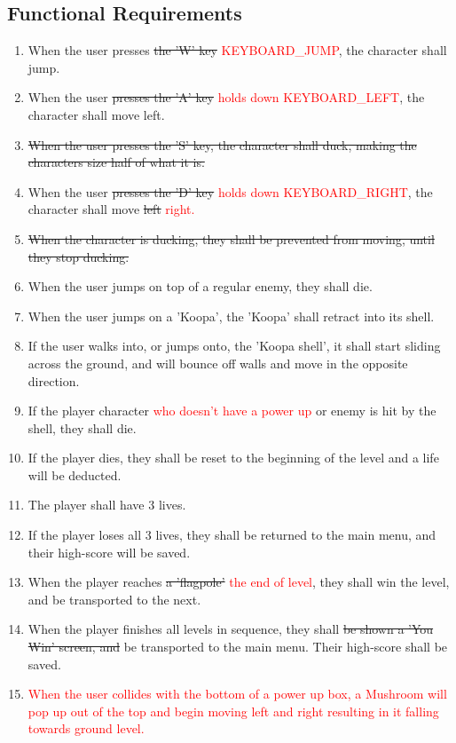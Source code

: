 \documentclass[12pt, titlepage]{article}
\begin{document}
\subsection{Functional Requirements}
\begin{enumerate}[{FR}1. ]
    \item When the user presses \sout{the 'W' key} \textcolor{red}{KEYBOARD\_JUMP}, the character shall jump.
    \item When the user \sout{presses the 'A' key} \textcolor{red}{holds down KEYBOARD\_LEFT}, the character shall move left.
    \item \sout{When the user presses the 'S' key, the character shall duck, making the characters size half of what it is.}
    \item When the user \sout{presses the 'D' key} \textcolor{red}{holds down KEYBOARD\_RIGHT}, the character shall move \sout{left} \textcolor{red}{right.}
    \item \sout{When the character is ducking, they shall be prevented from moving, until they stop ducking.}
    \item When the user jumps on top of a regular enemy, they shall die.
    \item When the user jumps on a 'Koopa', the 'Koopa' shall retract into its shell.
    \item If the user walks into, or jumps onto, the 'Koopa shell', it shall start sliding across the ground, and will bounce off walls and move in the opposite direction.
    \item If the player character \textcolor{red}{who doesn't have a power up} or enemy is hit by the shell, they shall die.
    \item If the player dies, they shall be reset to the beginning of the level and a life will be deducted.
    \item The player shall have 3 lives.
    \item If the player loses all 3 lives, they shall be returned to the main menu, and their high-score will be saved.
    \item When the player reaches \sout{a 'flagpole'} \textcolor{red}{the end of level}, they shall win the level, and be transported to the next.
    \item When the player finishes all levels in sequence, they shall \sout{be shown a 'You Win' screen, and} be transported to the main menu. Their high-score shall be saved.
    \item \textcolor{red}{When the user collides with the bottom of a power up box, a Mushroom will pop up out of the top and begin moving left and right resulting in it falling towards ground level.}

\end{enumerate}
\end{document}
